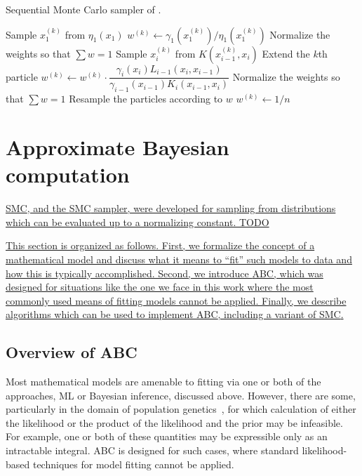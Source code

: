 {\begin{algorithm}
  \caption{Sequential Monte Carlo sampler of \textcite{del2006sequential}.}
  \begin{algorithmic}
      \State Sample $x_1^{(k)}$ from $\eta_1(x_1)$
      \State $w^{(k)} \gets \gamma_1(x_1^{(k)}) / \eta_1(x_1^{(k)})$
      \State Normalize the weights so that $\sum w = 1$
    \EndFor
        \State Sample $x_i^{(k)}$ from $K(x_{i-1}^{(k)}, x_i)$
        \Comment Extend the $k$th particle
        \State $w^{(k)} \gets w^{(k)} \cdot \dfrac{\gamma_i(x_i) L_{i-1}(x_i, x_{i-1})}{\gamma_{i-1}(x_{i-1}) K_i(x_{i-1}, x_i)}$
      \EndFor
      \State Normalize the weights so that $\sum w = 1$
        \State Resample the particles according to $w$
          \State $w^{(k)} \gets 1/n$
        \EndFor
      \EndIf
    \EndFor
  \end{algorithmic}
  \label{alg:smcsamp}
\end{algorithm}

\section{Approximate Bayesian computation}
\label{sec:abc}

{\color{blue}\uline{\acrlong{SMC}, and the \gls{SMC} sampler, were developed
for sampling from distributions which can be evaluated up to a normalizing
constant. TODO }

\uline{This section is organized as follows. First, we formalize the concept of a
mathematical model and discuss what it means to ``fit'' such models to data 
and how this is typically accomplished. Second, we introduce \gls{ABC}, which
was designed for situations like the one we face in this work where the most
commonly used means of fitting models cannot be applied. Finally, we describe
algorithms which can be used to implement \gls{ABC}, including a variant of
\gls{SMC}.}}

\subsection{Overview of ABC}
\label{subsec:abcoverview}

Most mathematical models are amenable to fitting via one or both of the
approaches, \gls{ML} or Bayesian inference, discussed above. However, there are
some, particularly in the domain of population
genetics~\autocite{beaumont2002approximate, beaumont2010approximate}, for which
calculation of either the likelihood or the product of the likelihood and the
prior may be infeasible. For example, one or both of these quantities may be
expressible only as an intractable integral. \Gls{ABC} is designed for such
cases, where standard likelihood-based techniques for model fitting cannot be
applied. 

}
